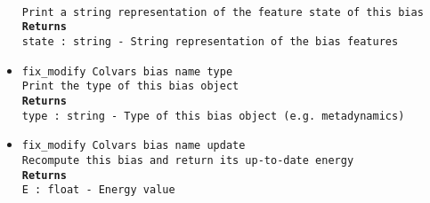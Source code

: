 \begin{itemize}
\\
\texttt{Print a string representation of the feature state of this bias}
\\
\texttt{\textbf{Returns}}
\\
\texttt{state : string - String representation of the bias features}
\item \texttt{fix\_modify Colvars bias name type}
\\
\texttt{Print the type of this bias object}
\\
\texttt{\textbf{Returns}}
\\
\texttt{type : string - Type of this bias object (e.g. metadynamics)}
\item \texttt{fix\_modify Colvars bias name update}
\\
\texttt{Recompute this bias and return its up-to-date energy}
\\
\texttt{\textbf{Returns}}
\\
\texttt{E : float - Energy value}
\end{itemize}

